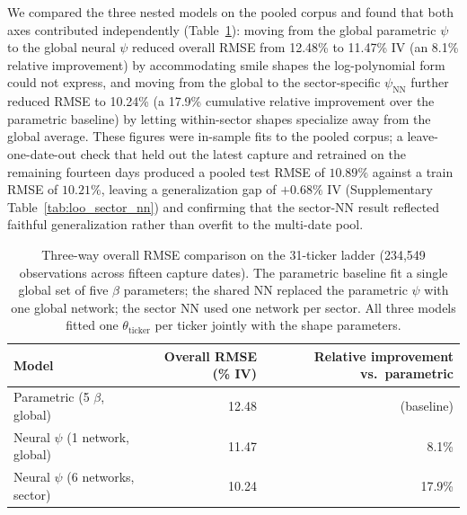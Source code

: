 We compared the three nested models on the pooled corpus and found that both axes contributed independently (Table~\ref{tab:three_way}): moving from the global parametric $\psi$ to the global neural $\psi$ reduced overall RMSE from 12.48\% to 11.47\% IV (an 8.1\% relative improvement) by accommodating smile shapes the log-polynomial form could not express, and moving from the global to the sector-specific $\psi_{\text{NN}}$ further reduced RMSE to 10.24\% (a 17.9\% cumulative relative improvement over the parametric baseline) by letting within-sector shapes specialize away from the global average. These figures were in-sample fits to the pooled corpus; a leave-one-date-out check that held out the latest capture and retrained on the remaining fourteen days produced a pooled test RMSE of $10.89\%$ against a train RMSE of $10.21\%$, leaving a generalization gap of $+0.68\%$ IV (Supplementary Table~\ref{tab:loo_sector_nn}) and confirming that the sector-NN result reflected faithful generalization rather than overfit to the multi-date pool.

\begin{table}[ht]
\centering
\caption{Three-way overall RMSE comparison on the 31-ticker ladder (234{,}549 observations across fifteen capture dates). The parametric baseline fit a single global set of five $\beta$ parameters; the shared NN replaced the parametric $\psi$ with one global network; the sector NN used one network per sector. All three models fitted one $\theta_{\text{ticker}}$ per ticker jointly with the shape parameters.}\label{tab:three_way}
\begin{tabular}{lrr}
\toprule
Model & Overall RMSE (\% IV) & Relative improvement vs.\ parametric \\
\midrule
Parametric (5 $\beta$, global)     & 12.48 & (baseline) \\
Neural $\psi$ (1 network, global)  & 11.47 & 8.1\% \\
Neural $\psi$ (6 networks, sector) & 10.24 & 17.9\% \\
\bottomrule
\end{tabular}
\end{table}

